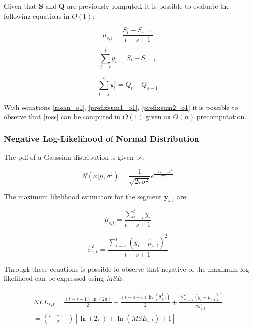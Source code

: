 Given that $\mathbf{S}$ and $\mathbf{Q}$ are previously computed, it is possible to evaluate the following equations in $O(1)$: 

\begin{equation}
    \label{mean_o1}
    \mu_{s, t} = \frac{S_{t} - S_{s - 1}}{t - s + 1}
\end{equation}

\begin{equation}
    \label{prefixsum1_o1}
    \sum \limits_{i = s}^{t} y_{i} = S_{t} - S_{s - 1}
\end{equation}

\begin{equation}
    \label{prefixsum2_o1}
    \sum \limits_{i = s}^{t} y_{i}^{2} = Q_{t} - Q_{s - 1}
\end{equation}

With equations \ref{mean_o1}, \ref{prefixsum1_o1}, \ref{prefixsum2_o1} it is possible to observe that \ref{mse} can be computed in $O(1)$ given an $O(n)$ precomputation.  

\subsubsection{Negative Log-Likelihood of Normal Distribution}

The pdf of a Gaussian distribution is given by:

\begin{equation}
    N(x | \mu, \sigma^{2}) = \frac{1}{\sqrt{2 \pi \sigma^{2}}} e^{\frac{-(x - \mu)^{2}}{2 \sigma^{2}}}
\end{equation}

The maximum likelihood estimators for the segment $\mathbf{y}_{s : t}$ are:

\begin{equation}
    \widehat{\mu}_{s, t} = \frac{\sum \limits_{i = s}^{t} y_{i}}{t - s + 1} 
\end{equation}

\begin{equation}
    \widehat{\sigma}_{s, t}^{2} = \frac{\sum \limits_{i = s}^{t} (y_{i} - \widehat{\mu}_{s, t})^{2}}{t - s + 1} 
\end{equation}

Through these equations is possible to observe that negative of the maximum log likelihood can be expressed using $MSE$:

\begin{equation}
    \begin{aligned}
        NLL_{s, t} = \frac{(t - s + 1) \ln(2 \pi)}{2} + \frac{(t - s + 1) \ln(\widehat{\sigma}_{s, t}^{2})}{2} + \frac{\sum \limits_{i = s}^{t} (y_{i} - \widehat{\mu}_{s, t})^{2}}{2 \widehat{\sigma}_{s, t}^{2}} \\
        = \left( \frac{t - s + 1}{2} \right) [\ln(2 \pi) + \ln(MSE_{s, t}) + 1]
    \end{aligned}
\end{equation}

